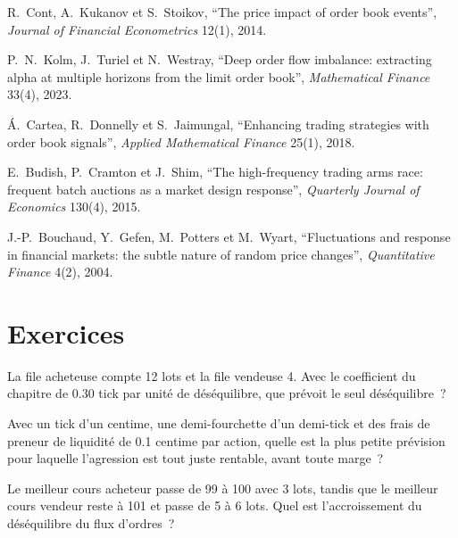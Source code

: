 \begin{omsources}
\item R.~Cont, A.~Kukanov et S.~Stoikov, ``The price impact of order book events'', \emph{Journal of Financial Econometrics} 12(1), 2014.
\item P.~N.~Kolm, J.~Turiel et N.~Westray, ``Deep order flow imbalance: extracting alpha at multiple horizons from the limit order book'',
\emph{Mathematical Finance} 33(4), 2023.
\item Á.~Cartea, R.~Donnelly et S.~Jaimungal, ``Enhancing trading strategies with order book signals'', \emph{Applied Mathematical Finance} 25(1),
2018.
\item E.~Budish, P.~Cramton et J.~Shim, ``The high-frequency trading arms race: frequent batch auctions as a market design response'',
\emph{Quarterly Journal of Economics} 130(4), 2015.
\item J.-P.~Bouchaud, Y.~Gefen, M.~Potters et M.~Wyart, ``Fluctuations and response in financial markets: the subtle nature of random price
changes'', \emph{Quantitative Finance} 4(2), 2004.
\end{omsources}

\section{Exercices}

\begin{exercise}[$\star$]\label{exo:hf:short-horizon-alpha:1}
La file acheteuse compte 12 lots et la file vendeuse 4. Avec le coefficient du chapitre de 0.30 tick par unité de déséquilibre, que
prévoit le seul déséquilibre~?
\end{exercise}

\begin{exercise}[$\star$]\label{exo:hf:short-horizon-alpha:2}
Avec un tick d'un centime, une demi-fourchette d'un demi-tick et des frais de preneur de liquidité de 0.1 centime par action, quelle est la plus petite prévision pour laquelle
l'agression est tout juste rentable, avant toute marge~?
\end{exercise}

\begin{exercise}[$\star$]\label{exo:hf:short-horizon-alpha:3}
Le meilleur cours acheteur passe de 99 à 100 avec 3 lots, tandis que le meilleur cours vendeur reste à 101 et passe de 5 à 6 lots. Quel est l'accroissement du déséquilibre du flux d'ordres~?
\end{exercise}

